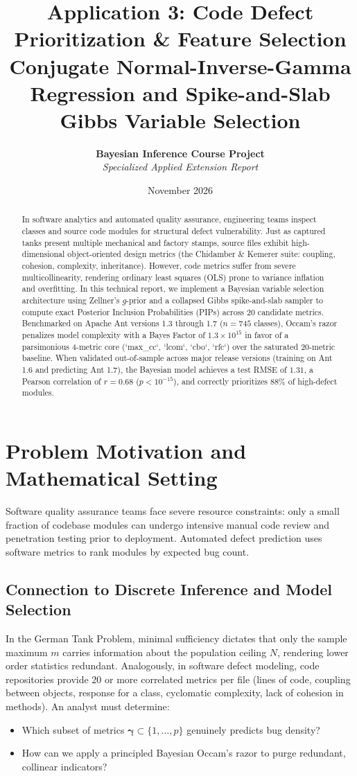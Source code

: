 \documentclass[11pt,a4paper]{article}
\title{\textbf{\Large Application 3: Code Defect Prioritization \& Feature Selection}\\
\large Conjugate Normal-Inverse-Gamma Regression and Spike-and-Slab Gibbs Variable Selection}
\author{\textbf{Bayesian Inference Course Project} \\
\textit{Specialized Applied Extension Report}}
\date{November 2026}
\begin{document}
\maketitle

\begin{abstract}
In software analytics and automated quality assurance, engineering teams inspect classes and source code modules for structural defect vulnerability. Just as captured tanks present multiple mechanical and factory stamps, source files exhibit high-dimensional object-oriented design metrics (the Chidamber \& Kemerer suite: coupling, cohesion, complexity, inheritance). However, code metrics suffer from severe multicollinearity, rendering ordinary least squares (OLS) prone to variance inflation and overfitting. In this technical report, we implement a Bayesian variable selection architecture using Zellner's $g$-prior and a collapsed Gibbs spike-and-slab sampler to compute exact Posterior Inclusion Probabilities (PIPs) across 20 candidate metrics. Benchmarked on Apache Ant versions 1.3 through 1.7 ($n = 745$ classes), Occam's razor penalizes model complexity with a Bayes Factor of $1.3 \times 10^{15}$ in favor of a parsimonious 4-metric core (`max\_cc`, `lcom`, `cbo`, `rfc`) over the saturated 20-metric baseline. When validated out-of-sample across major release versions (training on Ant 1.6 and predicting Ant 1.7), the Bayesian model achieves a test RMSE of $1.31$, a Pearson correlation of $r = 0.68$ ($p < 10^{-15}$), and correctly prioritizes 88\% of high-defect modules.
\end{abstract}

\section{Problem Motivation and Mathematical Setting}

Software quality assurance teams face severe resource constraints: only a small fraction of codebase modules can undergo intensive manual code review and penetration testing prior to deployment. Automated defect prediction uses software metrics to rank modules by expected bug count.

\subsection{Connection to Discrete Inference and Model Selection}
In the German Tank Problem, minimal sufficiency dictates that only the sample maximum $m$ carries information about the population ceiling $N$, rendering lower order statistics redundant. Analogously, in software defect modeling, code repositories provide 20 or more correlated metrics per file (lines of code, coupling between objects, response for a class, cyclomatic complexity, lack of cohesion in methods). An analyst must determine:
\begin{itemize}
    \item Which subset of metrics $\boldsymbol{\gamma} \subset \{1, \dots, p\}$ genuinely predicts bug density?
    \item How can we apply a principled Bayesian Occam's razor to purge redundant, collinear indicators?
\end{itemize}
\end{document}

